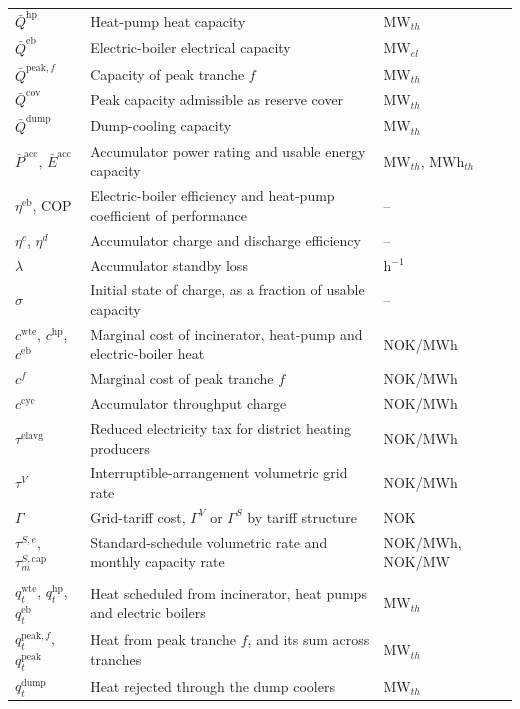 \begin{table}[!htbp]
\begin{tabular}{p{2.4cm} p{8.9cm} p{2.3cm}}
$\bar{Q}^{\text{hp}}$ & Heat-pump heat capacity & MW$_{th}$ \\
$\bar{Q}^{\text{eb}}$ & Electric-boiler electrical capacity & MW$_{el}$ \\
$\bar{Q}^{\text{peak},f}$ & Capacity of peak tranche $f$ & MW$_{th}$ \\
$\bar{Q}^{\text{cov}}$ & Peak capacity admissible as reserve cover & MW$_{th}$ \\
$\bar{Q}^{\text{dump}}$ & Dump-cooling capacity & MW$_{th}$ \\
$\bar{P}^{\text{acc}}$, $\bar{E}^{\text{acc}}$ & Accumulator power rating and usable energy capacity & MW$_{th}$, MWh$_{th}$ \\
$\eta^{\text{eb}}$, $\text{COP}$ & Electric-boiler efficiency and heat-pump coefficient of performance & -- \\
$\eta^{c}$, $\eta^{d}$ & Accumulator charge and discharge efficiency & -- \\
$\lambda$ & Accumulator standby loss & h$^{-1}$ \\
$\sigma$ & Initial state of charge, as a fraction of usable capacity & -- \\
$c^{\text{wte}}$, $c^{\text{hp}}$, $c^{\text{eb}}$ & Marginal cost of incinerator, heat-pump and electric-boiler heat & NOK/MWh \\
$c^{f}$ & Marginal cost of peak tranche $f$ & NOK/MWh \\
$c^{\text{cyc}}$ & Accumulator throughput charge & NOK/MWh \\
$\tau^{\text{elavg}}$ & Reduced electricity tax for district heating producers & NOK/MWh \\
$\tau^{V}$ & Interruptible-arrangement volumetric grid rate & NOK/MWh \\ $\Gamma$ & Grid-tariff cost, $\Gamma^{V}$ or $\Gamma^{S}$ by tariff structure & NOK \\
$\tau^{S,e}$, $\tau^{S,\text{cap}}_m$ & Standard-schedule volumetric rate and monthly capacity rate & NOK/MWh, NOK/MW \\
\addlinespace
\multicolumn{3}{l}{\textbf{Decision variables}} \\
$q^{\text{wte}}_t$, $q^{\text{hp}}_t$, $q^{\text{eb}}_t$ & Heat scheduled from incinerator, heat pumps and electric boilers & MW$_{th}$ \\
$q^{\text{peak},f}_t$, $q^{\text{peak}}_t$ & Heat from peak tranche $f$, and its sum across tranches & MW$_{th}$ \\
$q^{\text{dump}}_t$ & Heat rejected through the dump coolers & MW$_{th}$ \\

\end{tabular}
\end{table}
